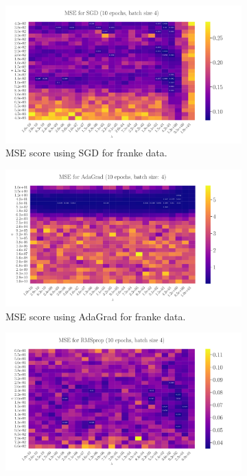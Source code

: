 \documentclass[%
reprint,s
amsmath,amssymb,
aps,
]{revtex4-2}
\begin{document}

\begin{figure}
	\begin{subfigure}{0.41\textwidth}
		\includegraphics[width=\textwidth]{Figures/LinRegSGD_25x25_epoch10_batchS4.pdf}
		\caption{MSE score using SGD for franke data.}
		\label{fig:LinReg25x25_epoch10_bacthS50}
	\end{subfigure}
	\hfill
	\begin{subfigure}{0.41\textwidth}
		\includegraphics[width=\textwidth]{Figures/LinRegAdaGrad_25x25_epoch10_batchS4.pdf}
		\caption{MSE score using AdaGrad for franke data.}
		\label{fig:LinReg25x25_epoch10_bacthS50_zoomed}
	\end{subfigure}
\hfill\newline
	\begin{subfigure}{0.41\textwidth}
		\includegraphics[width=\textwidth]{Figures/LinRegRMSprop_25x25_epoch10_batchS4.pdf}

\end{subfigure}
\end{figure}
\end{document}
